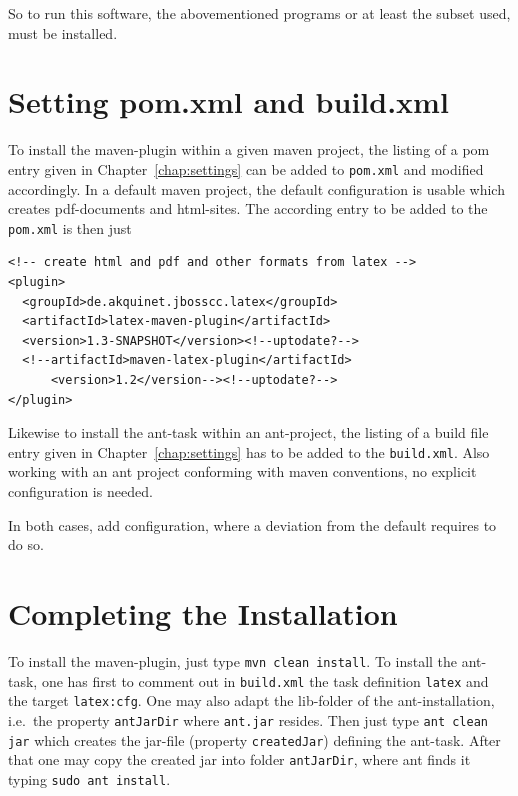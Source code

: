 \documentclass[12pt]{book}
\newcommand{\gls}[1]{#1}
\renewcommand{\index}[1]{ }
\begin{document}
So to run this software, the abovementioned programs 
or at least the subset used, must be installed. 

\section{Setting pom.xml and build.xml}\label{sec:sgml}

To install the maven-plugin within a given maven project, 
the listing of a pom entry given in Chapter~\ref{chap:settings} 
can be added to \texttt{pom.xml} and modified accordingly. 
In a default maven project, 
the default configuration is usable which creates pdf-documents and
\gls{html}-sites. 
The according entry to be added to the \texttt{pom.xml} is then just 
%
\lstset{language=xml, basicstyle=\small}
\begin{lstlisting}
<!-- create html and pdf and other formats from latex -->
<plugin>
  <groupId>de.akquinet.jbosscc.latex</groupId>
  <artifactId>latex-maven-plugin</artifactId>
  <version>1.3-SNAPSHOT</version><!--uptodate?-->
  <!--artifactId>maven-latex-plugin</artifactId>
      <version>1.2</version--><!--uptodate?-->
</plugin>
\end{lstlisting}

Likewise to install the ant-task within an ant-project, 
the listing of a build file entry given in Chapter~\ref{chap:settings} 
has to be added to the \texttt{build.xml}. 
Also working with an ant project 
conforming with maven conventions, 
no explicit configuration is needed. 
\index{ant-task}

In both cases, add configuration, 
where a deviation from the default requires to do so. 



\section{Completing the Installation}\label{sec:instComplete}

To install the maven-plugin, just type \texttt{mvn clean install}. 
To install the ant-task, one has first to comment out in \texttt{build.xml} 
the task definition \texttt{latex} and the target \texttt{latex:cfg}. 
One may also adapt the lib-folder of the ant-installation, 
i.e.~the property \texttt{antJarDir} where \texttt{ant.jar} resides. 
Then just type \texttt{ant clean jar} 
which creates the jar-file (property \texttt{createdJar}) defining the ant-task. 
After that one may copy the created jar into folder \texttt{antJarDir}, 
where ant finds it typing \texttt{sudo ant install}. 
\index{ant-task}
\end{document}
